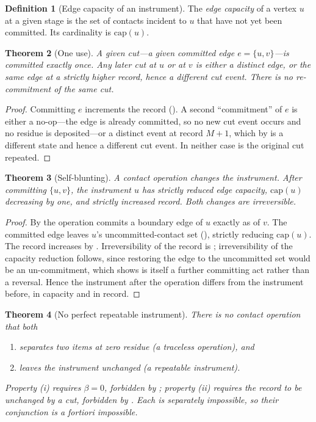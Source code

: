 \documentclass[11pt,twocolumn,a4paper]{article}
\theoremstyle{dirthm}
\newtheorem{theorem}{Theorem}[section]
\theoremstyle{definition}
\newtheorem{definition}[theorem]{Definition}
\theoremstyle{remark}
\newcommand{\flo}{\beta}
\newcommand{\rec}{M}
\newcommand{\set}[1]{\{#1\}}
\begin{document}
\begin{definition}[Edge capacity of an instrument]
\label{def:capacity}
The \emph{edge capacity} of a vertex $u$ at a given stage is the set of
contacts incident to $u$ that have not yet been committed. Its cardinality is
$\mathrm{cap}(u)$.
\end{definition}

\begin{theorem}[One use]
\label{thm:one-use}
A given cut---a given committed edge $e=\set{u,v}$---is committed exactly
once. Any later cut at $u$ or at $v$ is either a distinct edge, or the same
edge at a strictly higher record, hence a different cut event. There is no
re-commitment of the same cut.
\end{theorem}

\begin{proof}
Committing $e$ increments the record (). A second
``commitment'' of $e$ is either a no-op---the edge is already committed, so no
new cut event occurs and no residue is deposited---or a distinct event at
record $\rec+1$, which by  is a different state and hence a
different cut event. In neither case is the original cut repeated.
\end{proof}

\begin{theorem}[Self-blunting]
\label{thm:blunt}
A contact operation changes the instrument. After committing $\set{u,v}$,
the instrument $u$ has strictly reduced edge capacity,
$\mathrm{cap}(u)$ decreasing by one, and strictly increased record. Both
changes are irreversible.
\end{theorem}

\begin{proof}
By  the operation commits a boundary edge of $u$ exactly as
of $v$. The committed edge leaves $u$'s uncommitted-contact set
(), strictly reducing $\mathrm{cap}(u)$. The record
increases by . Irreversibility of the record is
; irreversibility of the capacity reduction follows,
since restoring the edge to the uncommitted set would be an un-commitment,
which  shows is itself a further committing act rather
than a reversal. Hence the instrument after the operation differs from the
instrument before, in capacity and in record.
\end{proof}

\begin{theorem}[No perfect repeatable instrument]
\label{thm:no-perfect}
There is no contact operation that both
\begin{enumerate}[label=\textup{(\roman*)},leftmargin=2.0em,itemsep=1pt]
\item separates two items at zero residue (a \emph{traceless} operation), and
\item leaves the instrument unchanged (a \emph{repeatable} instrument).
\end{enumerate}
Property (i) requires $\flo=0$, forbidden by ; property (ii)
requires the record to be unchanged by a cut, forbidden by
. Each is separately impossible, so their conjunction is a
fortiori impossible.
\end{theorem}
\end{document}
